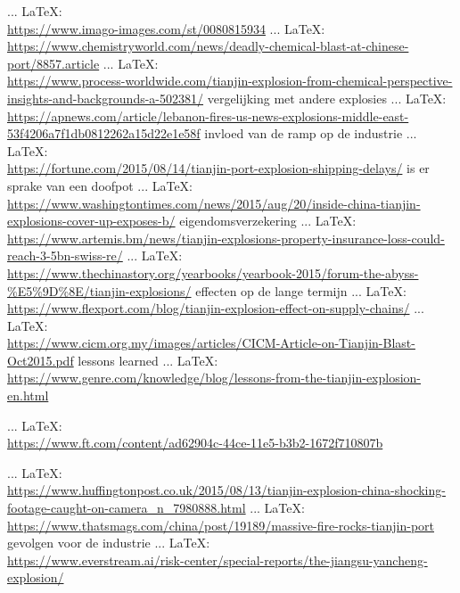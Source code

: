 \begin{thebibliography}{99}
     ... \LaTeX:\\ \url{https://www.imago-images.com/st/0080815934}
     ... \LaTeX:\\ \url{https://www.chemistryworld.com/news/deadly-chemical-blast-at-chinese-port/8857.article}
     ... \LaTeX:\\ \url{https://www.process-worldwide.com/tianjin-explosion-from-chemical-perspective-insights-and-backgrounds-a-502381/}
    vergelijking met andere explosies
     ... \LaTeX:\\ \url{https://apnews.com/article/lebanon-fires-us-news-explosions-middle-east-53f4206a7f1db0812262a15d22e1e58f}
    invloed van de ramp op de industrie
     ... \LaTeX:\\ \url{https://fortune.com/2015/08/14/tianjin-port-explosion-shipping-delays/}
    is er sprake van een doofpot
     ... \LaTeX:\\ \url{https://www.washingtontimes.com/news/2015/aug/20/inside-china-tianjin-explosions-cover-up-exposes-b/}
    eigendomsverzekering
     ... \LaTeX:\\ \url{https://www.artemis.bm/news/tianjin-explosions-property-insurance-loss-could-reach-3-5bn-swiss-re/}
     ... \LaTeX:\\ \url{https://www.thechinastory.org/yearbooks/yearbook-2015/forum-the-abyss-%E5%9D%8E/tianjin-explosions/}
    effecten op de lange termijn
     ... \LaTeX:\\ \url{https://www.flexport.com/blog/tianjin-explosion-effect-on-supply-chains/}
     ... \LaTeX:\\ \url{https://www.cicm.org.my/images/articles/CICM-Article-on-Tianjin-Blast-Oct2015.pdf}
    lessons learned
     ... \LaTeX:\\ \url{https://www.genre.com/knowledge/blog/lessons-from-the-tianjin-explosion-en.html}

     ... \LaTeX:\\ \url{https://www.ft.com/content/ad62904c-44ce-11e5-b3b2-1672f710807b}

     ... \LaTeX:\\ \url{https://www.huffingtonpost.co.uk/2015/08/13/tianjin-explosion-china-shocking-footage-caught-on-camera_n_7980888.html}
     ... \LaTeX:\\ \url{https://www.thatsmags.com/china/post/19189/massive-fire-rocks-tianjin-port}
    gevolgen voor de industrie
     ... \LaTeX:\\ \url{https://www.everstream.ai/risk-center/special-reports/the-jiangsu-yancheng-explosion/}


\end{thebibliography}

